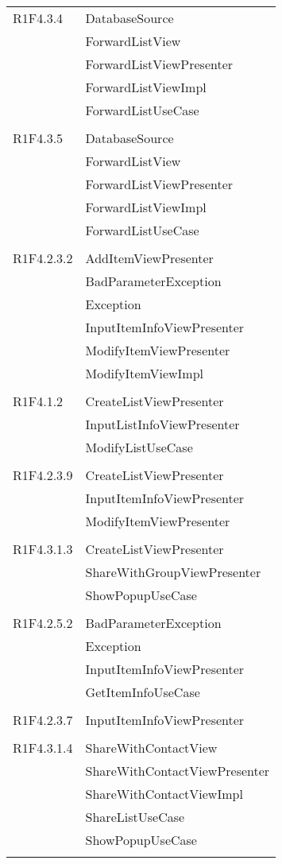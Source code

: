 \begin{center}
\begin{longtable}{|p{7cm}|p{7cm}|}
		R1F4.3.4 & DatabaseSource \\ & ForwardListView \\ & ForwardListViewPresenter \\ & ForwardListViewImpl \\ & ForwardListUseCase \\ & \\ \hline
		R1F4.3.5 & DatabaseSource \\ & ForwardListView \\ & ForwardListViewPresenter \\ & ForwardListViewImpl \\ & ForwardListUseCase \\ & \\ \hline
		R1F4.2.3.2 & AddItemViewPresenter \\ & BadParameterException \\ & Exception \\ & InputItemInfoViewPresenter \\ & ModifyItemViewPresenter \\ & ModifyItemViewImpl \\ & \\ \hline
		R1F4.1.2 & CreateListViewPresenter \\ & InputListInfoViewPresenter \\ & ModifyListUseCase \\ & \\ \hline
		R1F4.2.3.9 & CreateListViewPresenter \\ & InputItemInfoViewPresenter \\ & ModifyItemViewPresenter \\ & \\ \hline
		R1F4.3.1.3 & CreateListViewPresenter \\ & ShareWithGroupViewPresenter \\ & ShowPopupUseCase \\ & \\ \hline
		R1F4.2.5.2 & BadParameterException \\ & Exception \\ & InputItemInfoViewPresenter \\ & GetItemInfoUseCase \\ & \\ \hline
		R1F4.2.3.7 & InputItemInfoViewPresenter \\ & \\ \hline
		R1F4.3.1.4 & ShareWithContactView \\ & ShareWithContactViewPresenter \\ & ShareWithContactViewImpl \\ & ShareListUseCase \\ & ShowPopupUseCase \\ & \\ \hline

\end{longtable}
\end{center}
